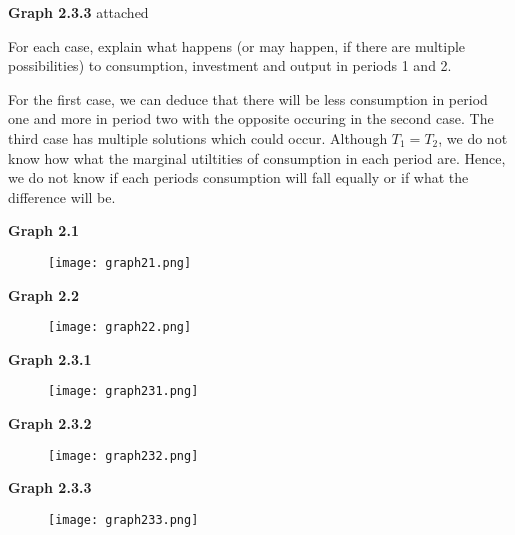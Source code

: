 \documentclass[11pt]{SelfArxOneColBMN}
\begin{document}
\begin{enumerate}
\begin{itemize}
\begin{solution}
      \textbf{Graph 2.3.3} attached
    \end{solution}
  \end{itemize}
  \indent For each case, explain what happens (or may happen, if there are multiple possibilities) to consumption, investment and output in periods 1 and 2.
  \begin{solution}
    For the first case, we can deduce that there will be less consumption in period one and more in period two with the opposite occuring in the second case. The third case has multiple solutions which could occur. Although $T_1 = T_2$, we do not know how what the marginal utiltities of consumption in each period are. Hence, we do not know if each periods consumption will fall equally or if what the difference will be.
  \end{solution}
\end{enumerate}
\newpage
\clearpage
\noindent \textbf{Graph 2.1}
\begin{figure}[h]
  \texttt{[image: graph21.png]}
  \end{figure}
\clearpage
\noindent \textbf{Graph 2.2}
\begin{figure}[h]
        \texttt{[image: graph22.png]}
\end{figure}
\newpage
\clearpage
\noindent \textbf{Graph 2.3.1}
\begin{figure}[h]
        \texttt{[image: graph231.png]}
\end{figure}
\newpage
\clearpage
\noindent \textbf{Graph 2.3.2}
\begin{figure}[h]
        \texttt{[image: graph232.png]}
\end{figure}
\newpage
\clearpage
\noindent \textbf{Graph 2.3.3}
\begin{figure}[h]
        \texttt{[image: graph233.png]}
\end{figure}
\end{document}
